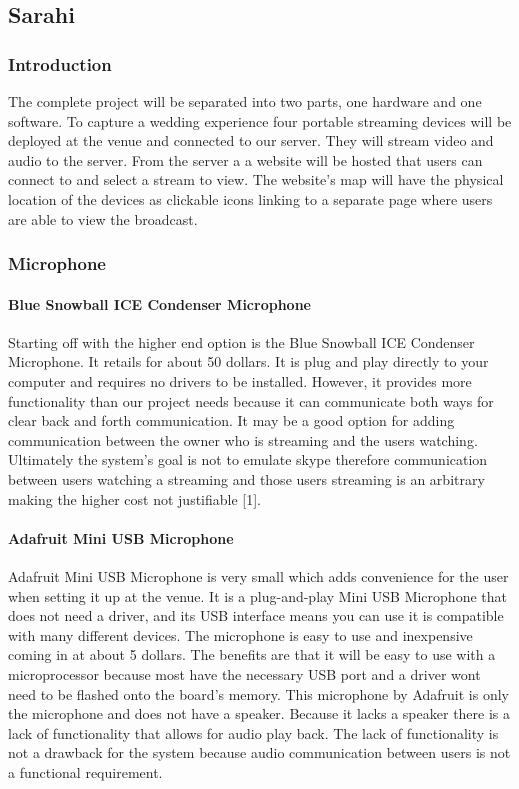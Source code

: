 \documentclass[onecolumn, draftclsnofoot,10pt, compsoc]{IEEEtran}
\begin{document}
    \subsection{Sarahi}
        \subsubsection{Introduction}
        The complete project will be separated into two parts, one hardware and one software.
        To capture a wedding experience four portable streaming devices will be deployed at the venue and connected to our server. They will stream video and audio to the server. From the server a a website will be hosted that users can connect to and select a stream to view. 
        The website's map will have the physical location of the devices as clickable icons linking to a separate page where users are able to view the broadcast. 
    
        \subsubsection{Microphone}
            \paragraph{Blue Snowball ICE Condenser Microphone}
            Starting off with the higher end option is the Blue Snowball ICE Condenser Microphone. It retails for about 50 dollars. It is plug and play directly to your computer and requires no drivers to be installed. However, it provides more functionality than our project needs because it can communicate both ways for clear back and forth communication. It may be a good option for adding communication between the owner who is streaming and the users watching. Ultimately the system's goal is not to emulate skype therefore communication between users watching a streaming and those users streaming is an arbitrary making the higher cost not justifiable [1].


            \paragraph{Adafruit Mini USB Microphone}
             Adafruit Mini USB Microphone is very small which adds convenience for the user when setting it up at the venue. It is a plug-and-play Mini USB Microphone that does not need a driver, and its USB interface means you can use it is compatible with many different devices. The microphone is easy to use and inexpensive coming in at about 5 dollars. The benefits are that it will be easy to use with a microprocessor because most have the necessary USB port and a driver wont need to be flashed onto the board's memory. This microphone by Adafruit is only the microphone and does not have a speaker. Because it lacks a speaker there is a lack of functionality that allows for audio play back. The lack of functionality is not a drawback for the system because audio communication between users is not a functional requirement.
           
\end{document}
